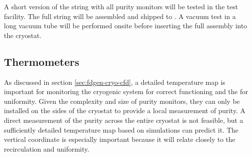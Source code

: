 





A short version of the %
string
with all purity monitors will be tested in the \lar test facility. The full string will be assembled and shipped to \surf. 
 A vacuum test in a long vacuum tube will be performed onsite before inserting the full assembly into the  cryostat. 



\subsection{Thermometers}
\label{sec:fdsp-cryo-therm}
As discussed in section \ref{sec:fdgen-cryo-cfd}, a detailed \threed temperature map is important %
for monitoring %
the cryogenic system for correct functioning and the \lar for uniformity.
Given the complexity and size of purity monitors, they can only be installed on the sides of the cryostat to provide a local measurement of
\lar purity. %
A direct measurement of the \lar purity across the entire cryostat is not feasible, but a sufficiently detailed \threed temperature map based on  simulations can predict it. The vertical coordinate is especially important because it will relate closely to the 
\lar recirculation and uniformity. 

